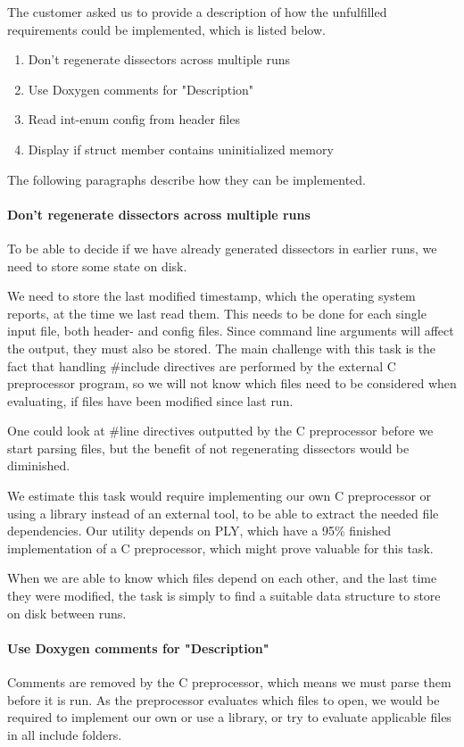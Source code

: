 The customer asked us to provide a description of how the unfulfilled
requirements could be implemented, which is listed below.
\begin{enumerate}
\item Don't regenerate dissectors across multiple runs
\item Use Doxygen comments for "Description"	
\item Read int-enum config from header files
\item Display if struct member contains uninitialized memory
\end{enumerate}

\noindent The following paragraphs describe how they can be implemented.
\paragraph{Don't regenerate dissectors across multiple runs}
To be able to decide if we have already generated dissectors in earlier runs, we need to store some state on disk. 

We need to store the last modified timestamp, which the operating system reports, at the time we last read them. 
This needs to be done for each single input file, both header- and config files.
Since command line arguments will affect the output, they must also be stored. The main challenge with this task is the fact that handling \#include directives are performed by the external C preprocessor program, so we will not know which files need to be considered when evaluating, if files have been modified since last run.

One could look at \#line directives outputted by the C preprocessor before we start parsing files, but the benefit of not regenerating dissectors would be diminished.

We estimate this task would require implementing our own C preprocessor or using a library instead of an external tool, to be able to extract the needed file dependencies. Our utility depends on PLY, which have a 95\% finished implementation of a C preprocessor, which might prove valuable for this task.

When we are able to know which files depend on each other, and the last time they were modified, the task is simply to find a suitable data structure to store on disk between runs.

\paragraph{Use Doxygen comments for "Description"}
Comments are removed by the C preprocessor, which means we must parse them before it is run. As the preprocessor evaluates which files to open, we would be required to implement our own or use a library, or try to evaluate applicable files in all include folders.

